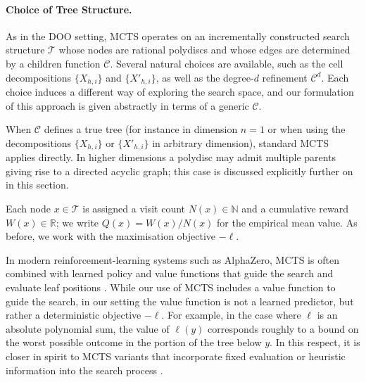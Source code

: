 \documentclass[10pt]{article}
\theoremstyle{definition}
\begin{document}
\paragraph{Choice of Tree Structure.} As in the DOO setting, MCTS operates on an incrementally constructed search structure $\mathcal{T}$ whose nodes are rational polydiscs and whose edges are determined by a children function $\mathcal{C}$. Several natural choices are available, such as the cell decompositions $\{X_{h,i}\}$ and $\{X'_{h,i}\}$, as well as the degree-$d$ refinement $\mathcal{C}^d$. Each choice induces a different way of exploring the search space, and our formulation of this approach is given abstractly in terms of a generic $\mathcal{C}$.

When $\mathcal{C}$ defines a true tree (for instance in dimension $n=1$ or when using the decompositions $\{X_{h,i}\}$ or $\{X'_{h,i}\}$ in arbitrary dimension), standard MCTS applies directly. In higher dimensions a polydisc may admit multiple parents giving rise to a directed acyclic graph; this case is discussed explicitly further on in this section.

Each node $x \in \mathcal{T}$ is assigned a visit count $N(x) \in \mathbb{N}$ and a cumulative reward $W(x) \in \mathbb{R}$; we write $Q(x) = W(x)/N(x)$ for the empirical mean value. As before, we work with the maximisation objective $-\ell$.

In modern reinforcement-learning systems such as AlphaZero, MCTS is often combined with learned policy and value functions that guide the search and evaluate leaf positions \cite{silver2018general}. While our use of MCTS includes a value function to guide the search, in our setting the value function is not a learned predictor, but rather a deterministic objective $-\ell$. For example, in the case where $\ell$ is an absolute polynomial sum, the value of $\ell(y)$ corresponds roughly to a bound on the worst possible outcome in the portion of the tree below $y$. In this respect, it is closer in spirit to MCTS variants that incorporate fixed evaluation or heuristic information into the search process \cite{lanctot2014monte,lorentz2016using}.

\end{document}
